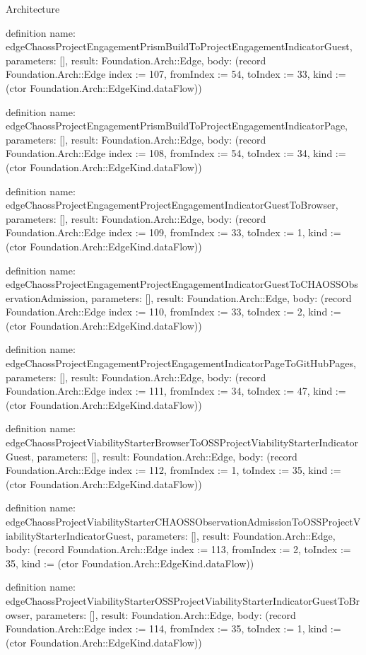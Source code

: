 \begin{lexlean}{Architecture}
\begin{semanticmodule}
definition{
  name: edgeChaossProjectEngagementPrismBuildToProjectEngagementIndicatorGuest,
  parameters: [],
  result: Foundation.Arch::Edge,
  body: (record Foundation.Arch::Edge {index := 107, fromIndex := 54, toIndex := 33, kind := (ctor Foundation.Arch::EdgeKind.dataFlow)})
}

definition{
  name: edgeChaossProjectEngagementPrismBuildToProjectEngagementIndicatorPage,
  parameters: [],
  result: Foundation.Arch::Edge,
  body: (record Foundation.Arch::Edge {index := 108, fromIndex := 54, toIndex := 34, kind := (ctor Foundation.Arch::EdgeKind.dataFlow)})
}

definition{
  name: edgeChaossProjectEngagementProjectEngagementIndicatorGuestToBrowser,
  parameters: [],
  result: Foundation.Arch::Edge,
  body: (record Foundation.Arch::Edge {index := 109, fromIndex := 33, toIndex := 1, kind := (ctor Foundation.Arch::EdgeKind.dataFlow)})
}

definition{
  name: edgeChaossProjectEngagementProjectEngagementIndicatorGuestToCHAOSSObservationAdmission,
  parameters: [],
  result: Foundation.Arch::Edge,
  body: (record Foundation.Arch::Edge {index := 110, fromIndex := 33, toIndex := 2, kind := (ctor Foundation.Arch::EdgeKind.dataFlow)})
}

definition{
  name: edgeChaossProjectEngagementProjectEngagementIndicatorPageToGitHubPages,
  parameters: [],
  result: Foundation.Arch::Edge,
  body: (record Foundation.Arch::Edge {index := 111, fromIndex := 34, toIndex := 47, kind := (ctor Foundation.Arch::EdgeKind.dataFlow)})
}

definition{
  name: edgeChaossProjectViabilityStarterBrowserToOSSProjectViabilityStarterIndicatorGuest,
  parameters: [],
  result: Foundation.Arch::Edge,
  body: (record Foundation.Arch::Edge {index := 112, fromIndex := 1, toIndex := 35, kind := (ctor Foundation.Arch::EdgeKind.dataFlow)})
}

definition{
  name: edgeChaossProjectViabilityStarterCHAOSSObservationAdmissionToOSSProjectViabilityStarterIndicatorGuest,
  parameters: [],
  result: Foundation.Arch::Edge,
  body: (record Foundation.Arch::Edge {index := 113, fromIndex := 2, toIndex := 35, kind := (ctor Foundation.Arch::EdgeKind.dataFlow)})
}

definition{
  name: edgeChaossProjectViabilityStarterOSSProjectViabilityStarterIndicatorGuestToBrowser,
  parameters: [],
  result: Foundation.Arch::Edge,
  body: (record Foundation.Arch::Edge {index := 114, fromIndex := 35, toIndex := 1, kind := (ctor Foundation.Arch::EdgeKind.dataFlow)})
}


\end{semanticmodule}
\end{lexlean}
